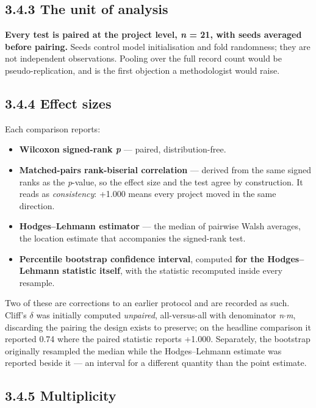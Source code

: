 \subsection{3.4.3 The unit of analysis}\label{the-unit-of-analysis}

\textbf{Every test is paired at the project level, \emph{n} = 21, with
seeds averaged before pairing.} Seeds control model initialisation and
fold randomness; they are not independent observations. Pooling over the
full record count would be pseudo-replication, and is the first
objection a methodologist would raise.

\subsection{3.4.4 Effect sizes}\label{effect-sizes}

Each comparison reports:

\begin{itemize}
\tightlist
\item
  \textbf{Wilcoxon signed-rank \emph{p}} \citep{wilcoxon1945} ---
  paired, distribution-free.
\item
  \textbf{Matched-pairs rank-biserial correlation} --- derived from the
  same signed ranks as the \emph{p}-value, so the effect size and the
  test agree by construction. It reads as \emph{consistency}: +1.000
  means every project moved in the same direction.
\item
  \textbf{Hodges--Lehmann estimator} \citep{hodges1963} --- the median
  of pairwise Walsh averages, the location estimate that accompanies the
  signed-rank test.
\item
  \textbf{Percentile bootstrap confidence interval}, computed
  \textbf{for the Hodges--Lehmann statistic itself}, with the statistic
  recomputed inside every resample.
\end{itemize}

Two of these are corrections to an earlier protocol and are recorded as
such. Cliff's \ensuremath{\delta} was initially computed \emph{unpaired}, all-versus-all
with denominator \emph{n}\ensuremath{\cdot}\emph{m}, discarding the pairing the design
exists to preserve; on the headline comparison it reported 0.74 where
the paired statistic reports +1.000. Separately, the bootstrap
originally resampled the median while the Hodges--Lehmann estimate was
reported beside it --- an interval for a different quantity than the
point estimate.

\subsection{3.4.5 Multiplicity}\label{multiplicity}

